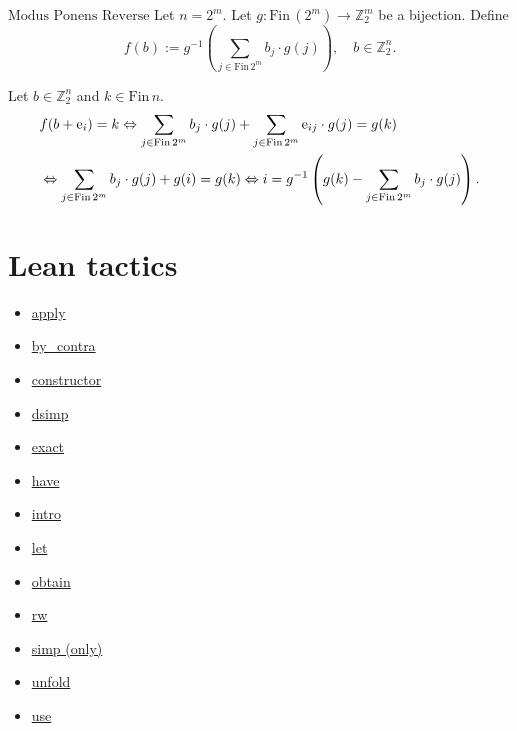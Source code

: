 \documentclass[11pt]{amsart}
\newcommand{\Zz}{\mathbb{Z}_2}
\newcommand{\Fin}{\mathrm{Fin}\,}
\begin{document}

$\boxed{\text{Modus Ponens Reverse}}$  Let $n=2^m$. Let $g : \Fin (2^m) \to \Zz^m$ be a bijection. Define
$$f(b) := g^{-1}\left(\sum_{j\in\Fin 2^m} b_j \cdot g(j)\right), \quad b\in\Zz^n.$$ 

Let $b\in\Zz^n$ and $k\in\Fin n$. 
\begin{align*}
& f(b+{\rm e}_i) = k 
 \Leftrightarrow \sum_{j\in\Fin 2^m} b_j \cdot g(j) + 
                  \sum_{j\in\Fin 2^m} {\rm e}_{ij} \cdot g(j) = g(k) \\
& \Leftrightarrow \sum_{j\in\Fin 2^m} b_j \cdot g(j) + g(i) = g(k)  \Leftrightarrow i = g^{-1}\left(g(k) - \sum_{j\in\Fin 2^m} b_j \cdot g(j)\right).
\end{align*}

\section{Lean tactics}

\begin{itemize}
    \item \href{https://leanprover-community.github.io/mathlib4_docs/tactics.html#Lean.Parser.Tactic.apply}{apply}
    \item \href{https://leanprover-community.github.io/mathlib4_docs/tactics.html#Batteries.Tactic.byContra}{by\_contra}
    \item \href{https://leanprover-community.github.io/mathlib4_docs/tactics.html#Lean.Parser.Tactic.constructor}{constructor}
    \item \href{https://leanprover-community.github.io/mathlib4_docs/tactics.html#Lean.Parser.Tactic.dsimp}{dsimp}
    \item \href{https://leanprover-community.github.io/mathlib4_docs/tactics.html#Lean.Parser.Tactic.exact}{exact}
    \item \href{https://leanprover-community.github.io/mathlib4_docs/tactics.html#Lean.Parser.Tactic.tacticHave__}{have}
    \item \href{https://leanprover-community.github.io/mathlib4_docs/tactics.html#Lean.Parser.Tactic.intro}{intro}
    \item \href{https://leanprover-community.github.io/mathlib4_docs/tactics.html#Lean.Parser.Tactic.tacticLet__}{let}
    \item \href{https://leanprover-community.github.io/mathlib4_docs/tactics.html#Lean.Parser.Tactic.obtain}{obtain}
    \item \href{https://leanprover-community.github.io/mathlib4_docs/tactics.html#Lean.Parser.Tactic.rwSeq}{rw}
    \item \href{https://leanprover-community.github.io/mathlib4_docs/tactics.html#Lean.Parser.Tactic.simp}{simp (only)}
    \item \href{https://leanprover-community.github.io/mathlib4_docs/tactics.html#Lean.Parser.Tactic.unfold}{unfold}
    \item \href{https://leanprover-community.github.io/mathlib4_docs/tactics.html#Mathlib.Tactic.useSyntax}{use}
\end{itemize}
\end{document}
